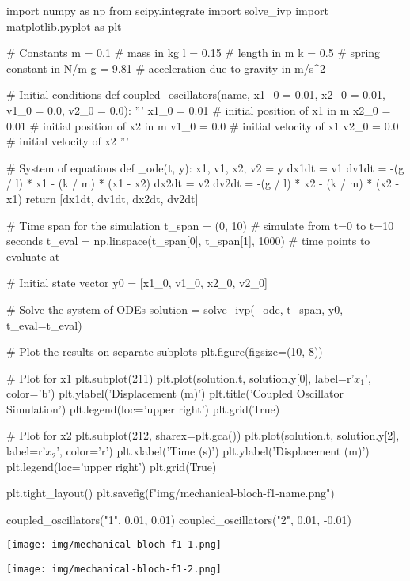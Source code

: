 \begin{python}
import numpy as np
from scipy.integrate import solve_ivp
import matplotlib.pyplot as plt

# Constants
m = 0.1  # mass in kg
l = 0.15  # length in m
k = 0.5  # spring constant in N/m
g = 9.81  # acceleration due to gravity in m/s^2

# Initial conditions
def coupled_oscillators(name, x1_0 = 0.01, x2_0 = 0.01, v1_0 = 0.0, v2_0 = 0.0):
  '''
  x1_0 = 0.01  # initial position of x1 in m
  x2_0 = 0.01  # initial position of x2 in m
  v1_0 = 0.0  # initial velocity of x1
  v2_0 = 0.0  # initial velocity of x2
  '''

  # System of equations
  def _ode(t, y):
    x1, v1, x2, v2 = y
    dx1dt = v1
    dv1dt = -(g / l) * x1 - (k / m) * (x1 - x2)
    dx2dt = v2
    dv2dt = -(g / l) * x2 - (k / m) * (x2 - x1)
    return [dx1dt, dv1dt, dx2dt, dv2dt]

  # Time span for the simulation
  t_span = (0, 10)  # simulate from t=0 to t=10 seconds
  t_eval = np.linspace(t_span[0], t_span[1], 1000)  # time points to evaluate at

  # Initial state vector
  y0 = [x1_0, v1_0, x2_0, v2_0]

  # Solve the system of ODEs
  solution = solve_ivp(_ode, t_span, y0, t_eval=t_eval)

  # Plot the results on separate subplots
  plt.figure(figsize=(10, 8))

  # Plot for x1
  plt.subplot(211)
  plt.plot(solution.t, solution.y[0], label=r'$x_1$', color='b')
  plt.ylabel('Displacement (m)')
  plt.title('Coupled Oscillator Simulation')
  plt.legend(loc='upper right')
  plt.grid(True)

  # Plot for x2
  plt.subplot(212, sharex=plt.gca())
  plt.plot(solution.t, solution.y[2], label=r'$x_2$', color='r')
  plt.xlabel('Time (s)')
  plt.ylabel('Displacement (m)')
  plt.legend(loc='upper right')
  plt.grid(True)

  plt.tight_layout()
  plt.savefig(f"img/mechanical-bloch-f1-{name}.png")

coupled_oscillators("1", 0.01, 0.01)
coupled_oscillators("2", 0.01, -0.01)
\end{python}

\begin{result}
\end{result}

\begin{center}
\texttt{[image: img/mechanical-bloch-f1-1.png]}
\end{center}
\begin{center}
\texttt{[image: img/mechanical-bloch-f1-2.png]}
\end{center}


